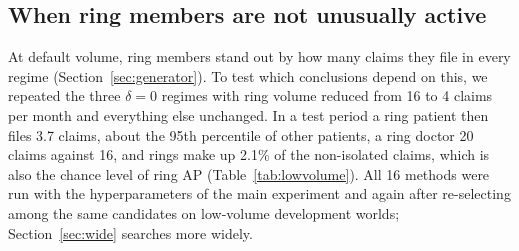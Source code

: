 \documentclass[pdflatex,sn-vancouver-num]{sn-jnl}
\begin{document}
\subsection{When ring members are not unusually active}\label{sec:lowvolume}
At default volume, ring members stand out by how many claims they file in
every regime (Section~\ref{sec:generator}). To test which conclusions depend
on this, we repeated the three $\delta=0$ regimes with ring volume reduced
from 16 to 4 claims per month and everything else unchanged. In a test
period a ring patient then files 3.7 claims, about the 95th percentile of
other patients, a ring doctor 20 claims against 16, and rings make up 2.1\%
of the non-isolated claims, which is also the chance level of ring AP
(Table~\ref{tab:lowvolume}). All 16 methods were run with the
hyperparameters of the main experiment and again after re-selecting among the
same candidates on low-volume development worlds; Section~\ref{sec:wide}
searches more widely.
\end{document}
